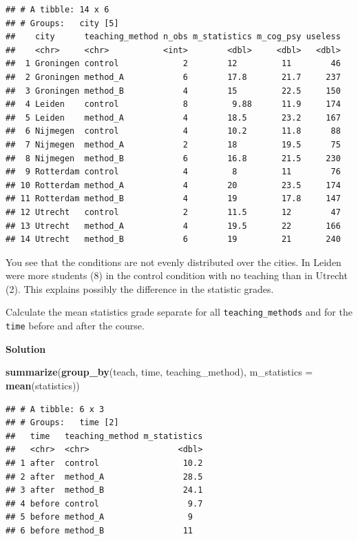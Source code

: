 \documentclass[
]{scrartcl}
\makeatletter
\newenvironment{Shaded}{\begin{snugshade}}{\end{snugshade}}
\newcommand{\AttributeTok}[1]{\textcolor[rgb]{0.13,0.29,0.53}{#1}}
\newcommand{\FunctionTok}[1]{\textcolor[rgb]{0.13,0.29,0.53}{\textbf{#1}}}
\newcommand{\NormalTok}[1]{#1}
\newenvironment{kframe}{%
\medskip{}
\setlength{\fboxsep}{.8em}
 \def\at@end@of@kframe{}%
 \ifinner\ifhmode%
  \def\at@end@of@kframe{\end{minipage}}%
  \begin{minipage}{\columnwidth}%
 \fi\fi%
 \def\FrameCommand##1{\hskip\@totalleftmargin \hskip-\fboxsep
 \colorbox{shadecolor}{##1}\hskip-\fboxsep
     \hskip-\linewidth \hskip-\@totalleftmargin \hskip\columnwidth}%
 \MakeFramed {\advance\hsize-\width
   \@totalleftmargin\z@ \linewidth\hsize
   \@setminipage}}%
 {\par\unskip\endMakeFramed%
 \at@end@of@kframe}
\newenvironment{rmdblock}[1]
  {
  \begin{itemize}
  \renewcommand{\labelitemi}{
    \raisebox{-.7\height}[0pt][0pt]{
      {\setkeys{Gin}{width=3em,keepaspectratio}\texttt{[image: images/\#1]}}
    }
  }
  \setlength{\fboxsep}{1em}
  \begin{kframe}
  \item
  }
  {
  \end{kframe}
  \end{itemize}
  }
\newenvironment{myexercise}
    {\begin{rmdblock}{exercise_green}}
    {\end{rmdblock}}
\newenvironment{webexsolution}[1]
    {\par\tiny\textbf{#1}}
    {\par}
\newcommand{\webexhide}[1]{\begin{webexsolution}{#1}}
\makeatother
\begin{document}
\begin{verbatim}
## # A tibble: 14 x 6
## # Groups:   city [5]
##    city      teaching_method n_obs m_statistics m_cog_psy useless
##    <chr>     <chr>           <int>        <dbl>     <dbl>   <dbl>
##  1 Groningen control             2        12         11        46
##  2 Groningen method_A            6        17.8       21.7     237
##  3 Groningen method_B            4        15         22.5     150
##  4 Leiden    control             8         9.88      11.9     174
##  5 Leiden    method_A            4        18.5       23.2     167
##  6 Nijmegen  control             4        10.2       11.8      88
##  7 Nijmegen  method_A            2        18         19.5      75
##  8 Nijmegen  method_B            6        16.8       21.5     230
##  9 Rotterdam control             4         8         11        76
## 10 Rotterdam method_A            4        20         23.5     174
## 11 Rotterdam method_B            4        19         17.8     147
## 12 Utrecht   control             2        11.5       12        47
## 13 Utrecht   method_A            4        19.5       22       166
## 14 Utrecht   method_B            6        19         21       240
\end{verbatim}

You see that the conditions are not evenly distributed over the cities. In Leiden were more students (8) in the control condition with no teaching than in Utrecht (2). This explains possibly the difference in the statistic grades.

\begin{myexercise}
Calculate the mean statistics grade separate for all
\texttt{teaching\_methods} and for the \texttt{time} before and after
the course.
\end{myexercise}
\webexhide{Solution}

\begin{Shaded}
\begin{Highlighting}[]
\FunctionTok{summarize}\NormalTok{(}\FunctionTok{group\_by}\NormalTok{(teach, time, teaching\_method), }\AttributeTok{m\_statistics =} \FunctionTok{mean}\NormalTok{(statistics))}
\end{Highlighting}
\end{Shaded}

\begin{verbatim}
## # A tibble: 6 x 3
## # Groups:   time [2]
##   time   teaching_method m_statistics
##   <chr>  <chr>                  <dbl>
## 1 after  control                 10.2
## 2 after  method_A                28.5
## 3 after  method_B                24.1
## 4 before control                  9.7
## 5 before method_A                 9  
## 6 before method_B                11
\end{verbatim}
\end{document}
